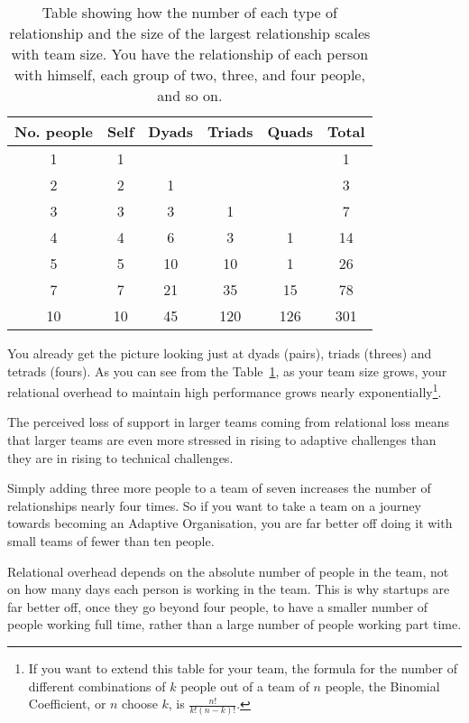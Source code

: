 \begin{table}[h]
        \centering
\begin{tabular}{c|cccc|c}
\toprule
\textbf{No. people} & \textbf{Self} & \textbf{Dyads} & \textbf{Triads} & \textbf{Quads} & \textbf{Total} \\
\midrule
1  & 1  &   &   &   & 1 \\
2  &  2 & 1  &   &   & 3 \\
3  &  3 &  3 & 1  &   & 7 \\
4  &  4 &  6 & 3  & 1 &  14 \\
5  &  5 & 10  & 10  & 1  & 26 \\
7  &  7 & 21  & 35  & 15  & 78 \\
10  &  10 & 45  & 120  & 126 & 301  \\
\bottomrule
\end{tabular} 
\caption[Relationship scaling]{Table showing how the number of each type of relationship and the size of the largest relationship scales with team size. You have the relationship of each person with himself, each group of two, three, and four people, and so on.}
\label{table:relationship-scaling}
\end{table}


You already get the picture looking just at dyads (pairs), triads (threes) and tetrads (fours). 
As you can see from the Table~\ref{table:relationship-scaling}, as your team size grows, your relational overhead to maintain high performance grows nearly exponentially\footnote{If you want to extend this table for your team, the formula for the number of different combinations of $k$ people out of a team of $n$ people, the Binomial Coefficient, or $n$ choose $k$, is $\frac{n!}{k!(n-k)!}$.}. 


The perceived loss of support in larger teams coming from relational loss means that larger teams are even more stressed in rising to adaptive challenges than they are in rising to technical challenges. 


Simply adding three more people to a team of seven increases the number of relationships nearly four times. So if you want to take a team on a journey towards becoming an Adaptive Organisation,  you are far better off doing it with small teams of fewer than ten people.


Relational overhead depends on the absolute number of people in the team, not on how many days each person is working in the team. This is why startups are far better off, once they go beyond four people, to have a smaller number of people working full time, rather than a large number of people working part time.




